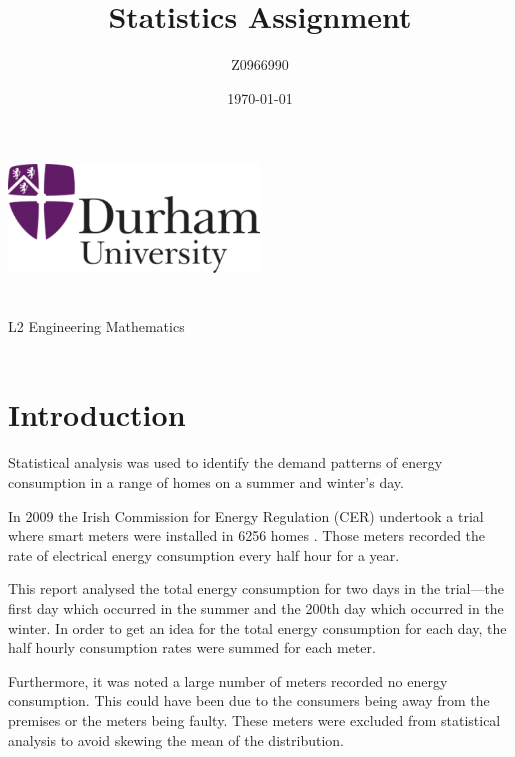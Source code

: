 \documentclass[a4paper,10pt]{article}
\author{Z0966990}
\title{Statistics Assignment}
\date{\today}
\begin{document}
    
\begin{titlepage}
    \centering
    \vspace*{\fill}
    \includegraphics[width=0.5\textwidth]{Durham}\\
    \vspace*{\fill}
    \LARGE\thetitle\\
    \large\theauthor\\
    \large L2 Engineering Mathematics\\
    \large\thedate\\
    \vspace*{\fill}
\end{titlepage}

\printnomenclature

\section{Introduction}

Statistical analysis was used to identify the demand patterns of energy 
consumption in a range of homes on a summer and winter's day.

In 2009 the Irish Commission for Energy Regulation (CER) undertook a trial 
where smart meters were installed in 6256 homes \cite{martinsmart}. Those 
meters recorded the rate  of electrical energy consumption every half hour for 
a year.

This report analysed the total energy consumption for two days in the 
trial---the first day which occurred in the summer and the 200th day which 
occurred in the winter. In order to get an idea for the total energy 
consumption for each day, the half hourly consumption rates were summed for 
each meter.

Furthermore, it was noted a large number of meters recorded no energy 
consumption. This could have been due to the consumers being away from the 
premises or the meters being faulty. These meters were excluded from 
statistical analysis to avoid skewing the mean of the distribution.
\end{document}
